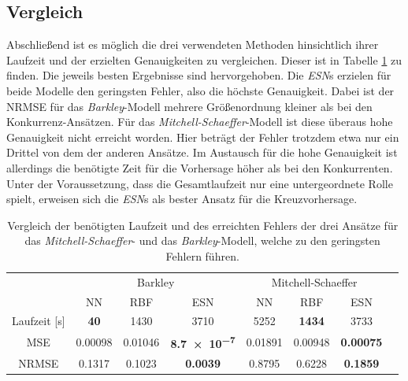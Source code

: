 \FloatBarrier
\subsection{Vergleich}
Abschließend ist es möglich die drei verwendeten Methoden hinsichtlich ihrer Laufzeit und der erzielten Genauigkeiten zu vergleichen. Dieser ist in Tabelle \ref{tab:exp_cross_comparison_results} zu finden. Die jeweils  besten Ergebnisse sind hervorgehoben. Die \textit{ESN}s erzielen für beide Modelle den geringsten Fehler, also die höchste Genauigkeit. Dabei ist der NRMSE für das \textit{Barkley}-Modell mehrere Größenordnung kleiner als bei den Konkurrenz-Ansätzen. Für das \textit{Mitchell-Schaeffer}-Modell ist diese überaus hohe Genauigkeit nicht erreicht worden. Hier beträgt der Fehler trotzdem etwa nur ein Drittel von dem der anderen Ansätze. Im Austausch für die hohe Genauigkeit ist allerdings die benötigte Zeit für die Vorhersage höher als bei den Konkurrenten. Unter der Voraussetzung, dass die Gesamtlaufzeit nur eine untergeordnete Rolle spielt, erweisen sich die \textit{ESN}s als bester Ansatz für die Kreuzvorhersage.
\begin{table}[h]
	\centering
	\captionsetup{width=0.9\linewidth}
	\begin{tabular}{cccccccc}
		\hline		
		\multicolumn{1}{c}{} & \multicolumn{3}{c}{Barkley} & \multicolumn{3}{c}{Mitchell-Schaeffer}		\\
		\multicolumn{1}{c}{} & NN & RBF & ESN & NN & RBF & ESN \\
		
		\hline
		
		Laufzeit [s] 	& \textbf{40} 		& 1430		& 3710		& 5252		& \textbf{1434} 		& 3733 \\
		MSE 			& 0.00098	& 0.01046	& \textbf{\num{8.7e-7}} 	& 0.01891	& 0.00948 	& \textbf{0.00075} \\
		NRMSE 			& 0.1317	& 0.1023	& \textbf{\num{0.0039}} 	& 0.8795	& 0.6228 	& \textbf{0.1859} \\
		\hline 
	\end{tabular} 
	\caption{Vergleich der benötigten Laufzeit und des erreichten Fehlers der drei Ansätze für das \textit{Mitchell-Schaeffer}- und das \textit{Barkley}-Modell, welche zu den geringsten Fehlern führen.}
	\label{tab:exp_cross_comparison_results}
\end{table}

\FloatBarrier